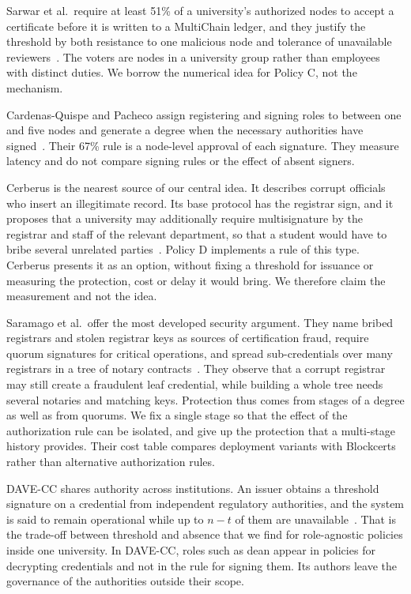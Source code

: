 Sarwar et al.\ require at least 51\% of a university's authorized nodes to accept a certificate before it is written to a MultiChain ledger, and they justify the threshold by both resistance to one malicious node and tolerance of unavailable reviewers~\cite{sarwar2026}. The voters are nodes in a university group rather than employees with distinct duties. We borrow the numerical idea for Policy C, not the mechanism.

Cardenas-Quispe and Pacheco assign registering and signing roles to between one and five nodes and generate a degree when the necessary authorities have signed~\cite{cardenas2025}. Their 67\% rule is a node-level approval of each signature. They measure latency and do not compare signing rules or the effect of absent signers.

Cerberus is the nearest source of our central idea. It describes corrupt officials who insert an illegitimate record. Its base protocol has the registrar sign, and it proposes that a university may additionally require multisignature by the registrar and staff of the relevant department, so that a student would have to bribe several unrelated parties~\cite{tariq2023}. Policy D implements a rule of this type. Cerberus presents it as an option, without fixing a threshold for issuance or measuring the protection, cost or delay it would bring. We therefore claim the measurement and not the idea.

Saramago et al.\ offer the most developed security argument. They name bribed registrars and stolen registrar keys as sources of certification fraud, require quorum signatures for critical operations, and spread sub-credentials over many registrars in a tree of notary contracts~\cite{saramago2021}. They observe that a corrupt registrar may still create a fraudulent leaf credential, while building a whole tree needs several notaries and matching keys. Protection thus comes from stages of a degree as well as from quorums. We fix a single stage so that the effect of the authorization rule can be isolated, and give up the protection that a multi-stage history provides. Their cost table compares deployment variants with Blockcerts rather than alternative authorization rules.

DAVE-CC shares authority across institutions. An issuer obtains a threshold signature on a credential from independent regulatory authorities, and the system is said to remain operational while up to $n-t$ of them are unavailable~\cite{tran2025}. That is the trade-off between threshold and absence that we find for role-agnostic policies inside one university. In DAVE-CC, roles such as dean appear in policies for decrypting credentials and not in the rule for signing them. Its authors leave the governance of the authorities outside their scope.

